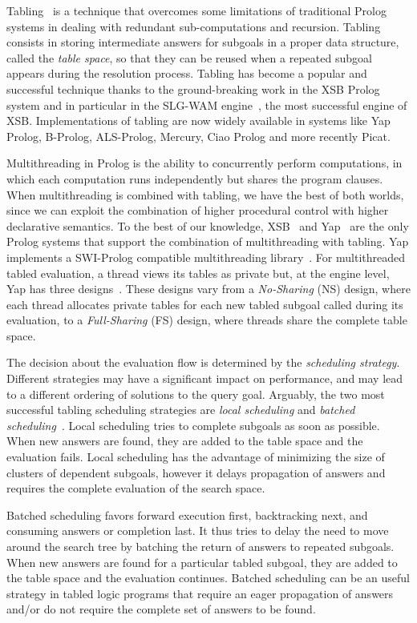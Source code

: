 \documentclass{llncs}
\begin{document}
Tabling~\cite{Chen-96} is a technique that overcomes some limitations
of traditional Prolog systems in dealing with redundant
sub-computations and recursion. Tabling consists in storing
intermediate answers for subgoals in a proper data structure, called
the \emph{table space}, so that they can be reused when a repeated
subgoal appears during the resolution process. Tabling has become a
popular and successful technique thanks to the ground-breaking work in
the XSB Prolog system and in particular in the SLG-WAM
engine~\cite{Sagonas-98}, the most successful engine of
XSB. Implementations of tabling are now widely available in systems
like Yap Prolog, B-Prolog, ALS-Prolog, Mercury, Ciao Prolog and more
recently Picat.

Multithreading in Prolog is the ability to concurrently perform
computations, in which each computation runs independently but shares
the program clauses. When multithreading is combined with tabling, we
have the best of both worlds, since we can exploit the combination of
higher procedural control with higher declarative semantics. To the
best of our knowledge, XSB~\cite{Marques-08} and Yap~\cite{Areias-12a}
are the only Prolog systems that support the combination of
multithreading with tabling. Yap implements a SWI-Prolog compatible
multithreading library~\cite{Wielemaker-03}. For multithreaded tabled
evaluation, a thread views its tables as private but, at the engine
level, Yap has three designs~\cite{Areias-12a}. These designs vary
from a \emph{No-Sharing} (NS) design, where each thread allocates
private tables for each new tabled subgoal called during its
evaluation, to a \emph{Full-Sharing} (FS) design, where threads share
the complete table space.

The decision about the evaluation flow is determined by the
\emph{scheduling strategy}. Different strategies may have a
significant impact on performance, and may lead to a different
ordering of solutions to the query goal. Arguably, the two most
successful tabling scheduling strategies are \emph{local scheduling}
and \emph{batched scheduling}~\cite{Freire-96}. Local scheduling tries
to complete subgoals as soon as possible. When new answers are found,
they are added to the table space and the evaluation fails. Local
scheduling has the advantage of minimizing the size of clusters of
dependent subgoals, however it delays propagation of answers and
requires the complete evaluation of the search space. 

Batched scheduling favors forward execution first, backtracking next,
and consuming answers or completion last. It thus tries to delay the
need to move around the search tree by batching the return of answers
to repeated subgoals. When new answers are found for a particular
tabled subgoal, they are added to the table space and the evaluation
continues. Batched scheduling can be an useful strategy in tabled
logic programs that require an eager propagation of answers and/or do
not require the complete set of answers to be found.
\end{document}
